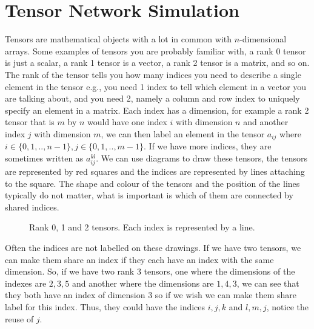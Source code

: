 \section{Tensor Network Simulation}\label{sec:tensor}
Tensors\cite{tensors} are mathematical objects with a lot in common with $n$-dimensional arrays. Some examples of tensors you are probably familiar with, a rank 0 tensor is just a scalar, a rank 1 tensor is a vector, a rank 2 tensor is a matrix, and so on. The rank of the tensor tells you how many indices you need to describe a single element in the tensor e.g., you need 1 index to tell which element in a vector you are talking about, and you need 2, namely a column and row index to uniquely specify an element in a matrix.  
Each index has a dimension, for example a rank 2 tensor that is $m$ by $n$ would have one index $i$ with dimension $n$ and another index $j$ with dimension $m$, we can then label an element in the tensor $a_{ij}$ where $i\in \{0,1,..,n-1\}, j\in \{0,1,..,m-1\}$. If we have more indices, they are sometimes written as $a_{ij}^{kl}$. 
We can use diagrams to draw these tensors, the tensors are represented by red squares and the indices are represented by lines attaching to the square. The shape and colour of the tensors and the position of the lines typically do not matter, what is important is which of them are connected by shared indices. 

\begin{figure}[H]
    \centering 
    \caption{Rank 0, 1 and 2 tensors. Each index is represented by a line.}
    \label{fig:r2t}
\end{figure}

\noindent
Often the indices are not labelled on these drawings. If we have two tensors, we can make them share an index if they each have an index with the same dimension. So, if we have two rank 3 tensors, one where the dimensions of the indexes are $2, 3, 5$ and another where the dimensions are $1, 4, 3$, we can see that they both have an index of dimension 3 so if we wish we can make them share label for this index. Thus, they could have the indices $i, j, k$ and $l, m, j$, notice the reuse of $j$. 

